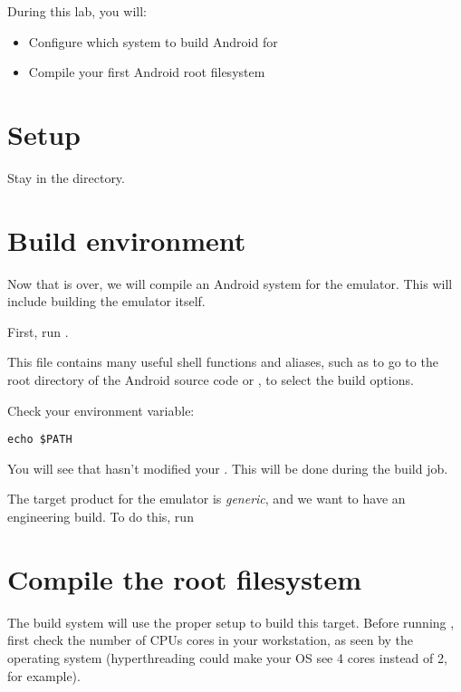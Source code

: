 
During this lab, you will:
\begin{itemize}
  \item Configure which system to build Android for
  \item Compile your first Android root filesystem
\end{itemize}

\section{Setup}

Stay in the  directory.

\section{Build environment}

Now that  is over, we will compile an Android system for the
emulator. This will include building the emulator itself.

First, run .

This file contains many useful shell functions and aliases, such as  to
go to the root directory of the Android source code or , to select
the build options.

Check your  environment variable:

\begin{verbatim}
echo $PATH
\end{verbatim}

You will see that   hasn't modified your .
This will be done during the build job.

The target product for the emulator is {\it generic}, and we want to have an 
engineering build. To do this, run 

\section{Compile the root filesystem}

The build system will use the proper setup to build this target. Before running
, first check the number of CPUs cores in your workstation, as seen by
the operating system (hyperthreading could make your OS see 4 cores instead of 2,
for example).

